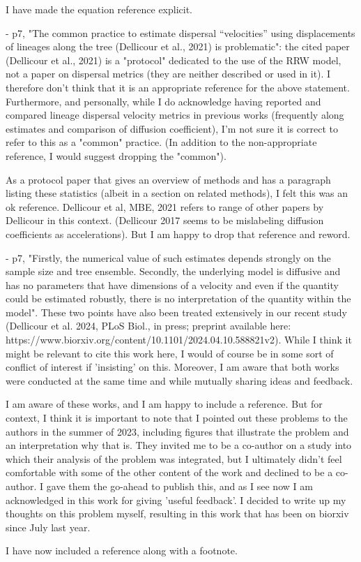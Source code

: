\documentclass[11pt, oneside]{article}   	%
\newcommand{\response}[1]{{\color{black}{\bf Response:} #1}}
\begin{document}
\response{I have made the equation reference explicit.}

- p7, "The common practice to estimate dispersal “velocities” using displacements of lineages along the tree (Dellicour et al., 2021) is problematic": the cited paper (Dellicour et al., 2021) is a "protocol" dedicated to the use of the RRW model, not a paper on dispersal metrics (they are neither described or used in it). I therefore don't think that it is an appropriate reference for the above statement. Furthermore, and personally, while I do acknowledge having reported and compared lineage dispersal velocity metrics in previous works (frequently along estimates and comparison of diffusion coefficient), I'm not sure it is correct to refer to this as a "common" practice. (In addition to the non-appropriate reference, I would suggest dropping the "common").

\response{As a protocol paper that gives an overview of methods and has a paragraph listing these statistics (albeit in a section on related methods), I felt this was an ok reference. Dellicour et al, MBE, 2021 refers to range of other papers by Dellicour in this context. (Dellicour 2017 seems to be mislabeling diffusion coefficients as accelerations). But I am happy to drop that reference and reword. }


- p7, "Firstly, the numerical value of such estimates depends strongly on the sample size and tree ensemble. Secondly, the underlying model is diffusive and has no parameters that have dimensions of a velocity and even if the quantity could be estimated robustly, there is no interpretation of the quantity within the model". These two points have also been treated extensively in our recent study (Dellicour et al. 2024, PLoS Biol., in press; preprint available here: https://www.biorxiv.org/content/10.1101/2024.04.10.588821v2). While I think it might be relevant to cite this work here, I would of course be in some sort of conflict of interest if 'insisting' on this. Moreover, I am aware that both works were conducted at the same time and while mutually sharing ideas and feedback.

\response{I am aware of these works, and I am happy to include a reference. But for context, I think it is important to note that I pointed out these problems to the authors in the summer of 2023, including figures that illustrate the problem and an interpretation why that is. They invited me to be a co-author on a study into which their analysis of the problem was integrated, but I ultimately didn't feel comfortable with some of the other content of the work and declined to be a co-author. I gave them the go-ahead to publish this, and as I see now I am acknowledged in this work for giving 'useful feedback'. I decided to write up my thoughts on this problem myself, resulting in this work that has been on biorxiv since July last year.

I have now included a reference along with a footnote.}
\end{document}
